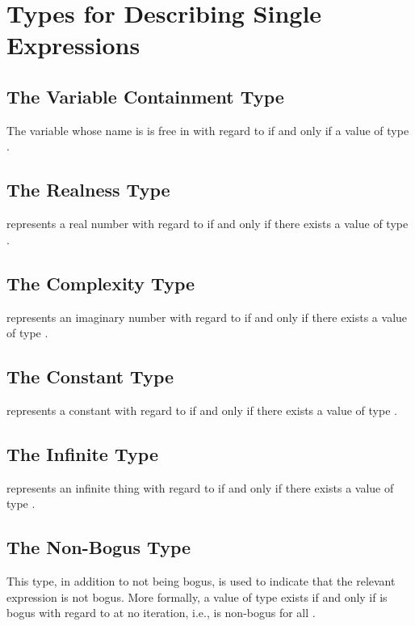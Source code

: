 \documentclass{report}
\begin{document}
\section{Types for Describing Single Expressions}

\subsection{The Variable Containment Type}
The variable whose name is  is free in  with regard to  if and only if a value of type    .

\subsection{The Realness Type}
 represents a real number with regard to  if and only if there exists a value of type   .

\subsection{The Complexity Type}
 represents an imaginary number with regard to  if and only if there exists a value of type   .

\subsection{The Constant Type}
 represents a constant with regard to  if and only if there exists a value of type   .

\subsection{The Infinite Type}
 represents an infinite thing with regard to  if and only if there exists a value of type   .

\subsection{The Non-Bogus Type}
This type, in addition to not being bogus, is used to indicate that the relevant expression is not bogus.  More formally, a value of type    exists if and only if  is bogus with regard to   at no iteration, i.e.,     is non-bogus for all .
\end{document}
